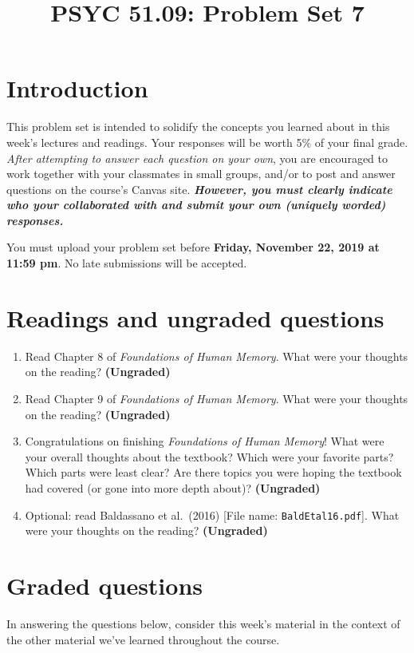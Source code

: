 \documentclass[11pt]{article}
\title{PSYC 51.09: Problem Set 7}
\date{}
\begin{document}
\maketitle
\vspace{-0.75in}
\section*{Introduction}
This problem set is intended to solidify the concepts you learned
about in this week's lectures and readings.  Your responses will be
worth 5\% of your final grade.  \textit{After attempting to answer
  each question on your own}, you are encouraged to work together with your classmates in small groups, and/or to post and answer questions on the course’s Canvas site.  \textbf{\textit{However, you must clearly indicate who your collaborated with and submit your own (uniquely worded) responses.}}

You must upload your problem set before \textbf{Friday, November 22, 2019 at 11:59 pm}.  No late submissions will be accepted.

\section*{Readings and ungraded questions}
\begin{enumerate}
\item Read Chapter 8 of \textit{Foundations of Human Memory}.  What were your thoughts on the reading?
  \textbf{(Ungraded)}

\item Read Chapter 9 of \textit{Foundations of Human Memory}.  What were your thoughts on the reading?
  \textbf{(Ungraded)}

\item Congratulations on finishing \textit{Foundations of Human
    Memory}!  What were your overall thoughts about the textbook?
  Which were your favorite parts?  Which parts were least clear?  Are
  there topics you were hoping the textbook had covered (or gone into
  more depth about)?  \textbf{(Ungraded)}

\item Optional: read Baldassano et al.\ (2016) [File name:
  \texttt{BaldEtal16.pdf}].  What
were your thoughts on the reading? \textbf{(Ungraded)}
\end{enumerate}

\section*{Graded questions}
In answering the questions below, consider this week's material in the
context of the other material we've learned throughout the course.
\end{document}
